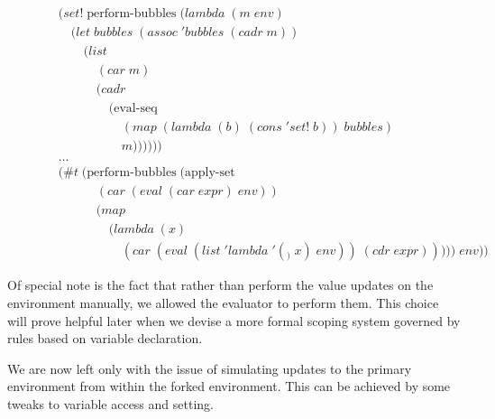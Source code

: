 \begin{figure}[htp]
\caption{}\label{fig:performBubblesDef}
\begin{align*}
& (set! \; \text{perform-bubbles} \; (lambda \; (m \; env)
\\& \quad (let \; bubbles \; (assoc \; 'bubbles \; (cadr \; m))
\\& \qquad (list
\\& \qquad \quad (car \; m)
\\& \qquad \quad (cadr \; 
\\& \qquad \qquad (\text{eval-seq}
\\& \qquad \qquad \quad (map \; (lambda \; (b) \; (cons \; 'set! \; b)) \; bubbles)
\\& \qquad \qquad \quad m))))))
\\& \dots
\\& (\#t \; (\text{perform-bubbles} \; (\text{apply-set} \; 
\\& \qquad \quad (car \; (eval \; (car \; expr) \; env))
\\& \qquad \quad (map \; 
\\& \qquad \qquad (lambda \; (x) \; 
\\& \qquad \qquad \quad (car \; (eval \; (list \; 'lambda \; '(_) \; x) \; env)) \; (cdr \; expr))))) \; env))
\end{align*}
\end{figure}

Of special note is the fact that rather than perform the value updates on the
environment manually, we allowed the evaluator to perform them. This choice
will prove helpful later when we devise a more formal scoping system governed
by rules based on variable declaration.

We are now left only with the issue of simulating updates to the primary
environment from within the forked environment. This can be achieved by some
tweaks to variable access and setting.


